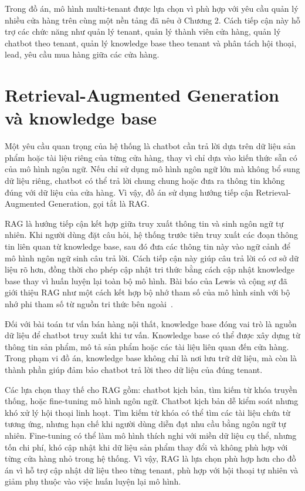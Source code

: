 \documentclass[../DoAn.tex]{subfiles}
\begin{document}
Trong đồ án, mô hình multi-tenant được lựa chọn vì phù hợp với yêu cầu quản lý nhiều cửa hàng trên cùng một nền tảng đã nêu ở Chương 2. Cách tiếp cận này hỗ trợ các chức năng như quản lý tenant, quản lý thành viên cửa hàng, quản lý chatbot theo tenant, quản lý knowledge base theo tenant và phân tách hội thoại, lead, yêu cầu mua hàng giữa các cửa hàng.

\section{Retrieval-Augmented Generation và knowledge base}
\label{section:3.2}

Một yêu cầu quan trọng của hệ thống là chatbot cần trả lời dựa trên dữ liệu sản phẩm hoặc tài liệu riêng của từng cửa hàng, thay vì chỉ dựa vào kiến thức sẵn có của mô hình ngôn ngữ. Nếu chỉ sử dụng mô hình ngôn ngữ lớn mà không bổ sung dữ liệu riêng, chatbot có thể trả lời chung chung hoặc đưa ra thông tin không đúng với dữ liệu của cửa hàng. Vì vậy, đồ án sử dụng hướng tiếp cận Retrieval-Augmented Generation, gọi tắt là RAG.

RAG là hướng tiếp cận kết hợp giữa truy xuất thông tin và sinh ngôn ngữ tự nhiên. Khi người dùng đặt câu hỏi, hệ thống trước tiên truy xuất các đoạn thông tin liên quan từ knowledge base, sau đó đưa các thông tin này vào ngữ cảnh để mô hình ngôn ngữ sinh câu trả lời. Cách tiếp cận này giúp câu trả lời có cơ sở dữ liệu rõ hơn, đồng thời cho phép cập nhật tri thức bằng cách cập nhật knowledge base thay vì huấn luyện lại toàn bộ mô hình. Bài báo của Lewis và cộng sự đã giới thiệu RAG như một cách kết hợp bộ nhớ tham số của mô hình sinh với bộ nhớ phi tham số từ nguồn tri thức bên ngoài~\cite{lewis2020rag}.

Đối với bài toán tư vấn bán hàng nội thất, knowledge base đóng vai trò là nguồn dữ liệu để chatbot truy xuất khi tư vấn. Knowledge base có thể được xây dựng từ thông tin sản phẩm, mô tả sản phẩm hoặc các tài liệu liên quan đến cửa hàng. Trong phạm vi đồ án, knowledge base không chỉ là nơi lưu trữ dữ liệu, mà còn là thành phần giúp đảm bảo chatbot trả lời theo dữ liệu của đúng tenant.

Các lựa chọn thay thế cho RAG gồm: chatbot kịch bản, tìm kiếm từ khóa truyền thống, hoặc fine-tuning mô hình ngôn ngữ. Chatbot kịch bản dễ kiểm soát nhưng khó xử lý hội thoại linh hoạt. Tìm kiếm từ khóa có thể tìm các tài liệu chứa từ tương ứng, nhưng hạn chế khi người dùng diễn đạt nhu cầu bằng ngôn ngữ tự nhiên. Fine-tuning có thể làm mô hình thích nghi với miền dữ liệu cụ thể, nhưng tốn chi phí, khó cập nhật khi dữ liệu sản phẩm thay đổi và không phù hợp với từng cửa hàng nhỏ trong hệ thống. Vì vậy, RAG là lựa chọn phù hợp hơn cho đồ án vì hỗ trợ cập nhật dữ liệu theo từng tenant, phù hợp với hội thoại tự nhiên và giảm phụ thuộc vào việc huấn luyện lại mô hình.
\end{document}
